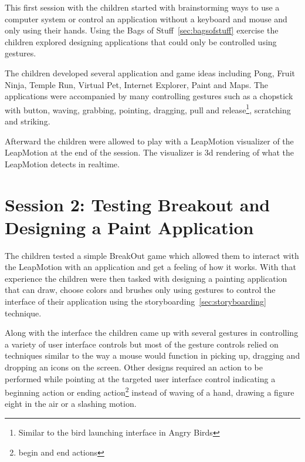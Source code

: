 This first session with the children started with brainstorming ways to use a computer system or control an application without a keyboard and mouse and only using their hands. Using the Bags of Stuff~\ref{sec:bagsofstuff} exercise the children explored designing applications that could only be controlled using gestures.

The children developed several application and game ideas including Pong, Fruit Ninja, Temple Run, Virtual Pet, Internet Explorer, Paint and Maps. The applications were accompanied by many controlling gestures such as a chopstick with button, waving, grabbing, pointing, dragging, pull and release\footnote{Similar to the bird launching interface in Angry Birds}, scratching and striking. 

Afterward the children were allowed to play with a LeapMotion visualizer of the LeapMotion at the end of the session. The visualizer is 3d rendering of what the LeapMotion detects in realtime. 




\section{Session 2: Testing Breakout and Designing a Paint Application}\label{session2}
The children tested a simple BreakOut game which allowed them to interact with the LeapMotion with an application and get a feeling of how it works. With that experience the children were then tasked with designing a painting application that can draw, choose colors and brushes only using gestures to control the interface of their application using the storyboarding~\ref{sec:storyboarding} technique. 

Along with the interface the children came up with several gestures in controlling a variety of user interface controls but most of the gesture controls relied on techniques similar to the way a mouse would function in picking up, dragging and dropping an icons on the screen. Other designs required an action to be performed while pointing at the targeted user interface control indicating a beginning action or ending action\footnote{begin and end actions} instead of waving of a hand, drawing a figure eight in the air or a slashing motion. 

